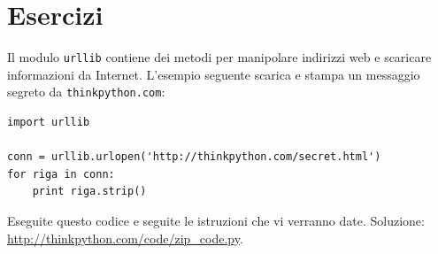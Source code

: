 \documentclass[10pt]{book}
\begin{document}
\section{Esercizi}

\begin{exercise}
\label{urllib}

Il modulo {\tt urllib} contiene dei metodi per manipolare indirizzi web e scaricare informazioni da Internet. L'esempio seguente scarica e stampa un messaggio segreto da {\tt thinkpython.com}:

\begin{verbatim}
import urllib

conn = urllib.urlopen('http://thinkpython.com/secret.html')
for riga in conn:
    print riga.strip()
\end{verbatim}

Eseguite questo codice e seguite le istruzioni che vi verranno date. Soluzione: \url{http://thinkpython.com/code/zip_code.py}.

\end{exercise}





%

\end{document}
